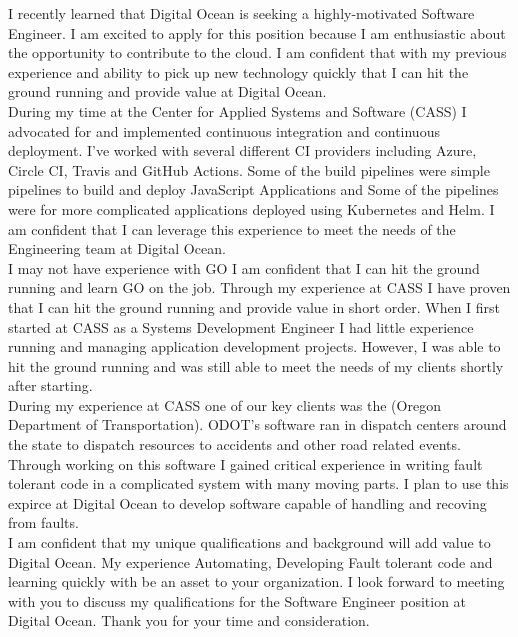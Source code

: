 \documentclass[11pt, a4paper]{awesome-cv}
\begin{document}
\makecvheader

\makelettertitle



\begin{cvletter}
    I recently learned that Digital Ocean is seeking a highly-motivated Software Engineer. I am excited to apply for this position because I am enthusiastic about the opportunity to contribute to the cloud. I am confident that with my previous experience and ability to pick up new technology quickly that I can hit the ground running and provide value at Digital Ocean.\\
    
    During my time at the Center for Applied Systems and Software (CASS) I advocated for and implemented continuous integration and continuous deployment. I've worked with several different CI providers including Azure, Circle CI, Travis and GitHub Actions. Some of the build pipelines were simple pipelines to build and deploy JavaScript Applications and Some of the pipelines were for more complicated applications deployed using Kubernetes and Helm. I am confident that I can leverage this experience to meet the needs of the Engineering team at Digital Ocean.\\
    
    I may not have experience with GO I am confident that I can hit the ground running and learn GO on the job. Through my experience at CASS I have proven that I can hit the ground running and provide value in short order. When I first started at CASS as a Systems Development Engineer I had little experience running and managing application development projects. However, I was able to hit the ground running and was still able to meet the needs of my clients shortly after starting.\\ 
    
    During my experience at CASS one of our key clients was the (Oregon Department of Transportation). ODOT's software ran in dispatch centers around the state to dispatch resources to accidents and other road related events. Through working on this software I gained critical experience in writing fault tolerant code in a complicated system with many moving parts. I plan to use this expirce at Digital Ocean to develop software capable of handling and recoving from faults.\\
    
    I am confident that my unique qualifications and background will add value to Digital Ocean. My experience Automating, Developing Fault tolerant code and learning quickly with be an asset to your organization. I look forward to meeting with you to discuss my qualifications for the Software Engineer position at Digital Ocean. Thank you for your time and consideration.\\
    

\end{cvletter}

\makeletterclosing
\end{document}
